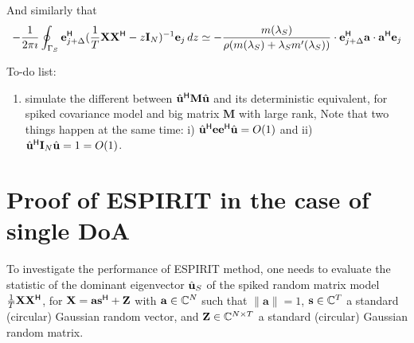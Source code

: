 \documentclass[11pt,a4paper]{article}
\begin{document}
And similarly that
\begin{equation}
	-\frac1{2\pi \imath} \oint_{\Gamma_S} \mathbf{e}_{j+\Delta}^{\sf H} (\frac1T {\mathbf{X}} {\mathbf{X}}^{\sf H} - z \mathbf{I}_N)^{-1} \mathbf{e}_j\,dz \simeq -\frac{m(\lambda_S)}{ \rho ( m(\lambda_S) + \lambda_S m'(\lambda_S)) } \cdot \mathbf{e}_{j+\Delta}^{\sf H} \mathbf{a} \cdot \mathbf{a}^{\sf H} \mathbf{e}_j
\end{equation}

{\BLUE 
To-do list:
\begin{enumerate}
	\item simulate the different between $\hat {\mathbf{u}}^{\sf H} \mathbf{M} \hat {\mathbf{u}}$ and its deterministic equivalent, for spiked covariance model and big matrix $\mathbf{M}$ with large rank, Note that two things happen at the same time: i) $\hat {\mathbf{u}}^{\sf H} \mathbf{e e}^{\sf H} \hat {\mathbf{u}} = O(1)$ and ii) $\hat {\mathbf{u}}^{\sf H} \mathbf{I}_N \hat {\mathbf{u}} = 1 =O(1)$.
\end{enumerate}
}

\section{Proof of ESPIRIT in the case of single DoA}

To investigate the performance of ESPIRIT method, one needs to evaluate the statistic of the dominant eigenvector $\hat {\mathbf{u}}_S$ of the spiked random matrix model $\frac1T {\mathbf{X}} {\mathbf{X}}^{\sf H}$, for ${\mathbf{X}} = \mathbf{a} \mathbf{s}^{\sf H} + {\mathbf{Z}}$ with $\mathbf{a} \in {\mathbb{C}}^N$ such that $\| \mathbf{a} \| = 1$, $\mathbf{s} \in {\mathbb{C}}^T$ a standard (circular) Gaussian random vector, and ${\mathbf{Z}} \in {\mathbb{C}}^{N \times T}$ a standard (circular) Gaussian random matrix.
\end{document}
